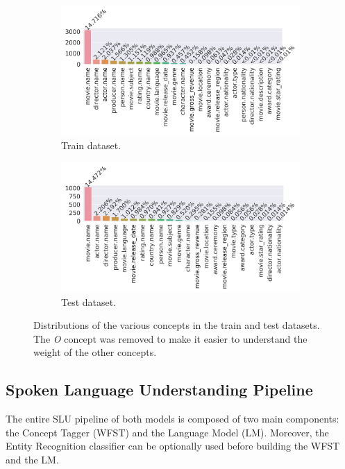\documentclass[11pt,a4paper]{article}
\begin{document}
\begin{figure}
	\begin{subfigure}[b]{0.5\linewidth}
		\includegraphics[width=\linewidth]{img/train-concepts-distribution}
		\caption{Train dataset.}
	\end{subfigure}
	\begin{subfigure}[b]{0.5\linewidth}
	\includegraphics[width=\textwidth]{img/test-concepts-distribution}
	\caption{Test dataset.}
	\end{subfigure}
	\caption{Distributions of the various concepts in the train and test datasets. The \textit{O} concept was removed to make it easier to understand the weight of the other concepts.}
	\label{fig:concept-distribution}
\end{figure}

\subsection{Spoken Language Understanding Pipeline}

The entire SLU pipeline of both models is composed of two main components: the Concept Tagger (WFST) and the Language Model (LM). Moreover, the Entity Recognition classifier can be optionally used before building the WFST and the LM. 
\end{document}

